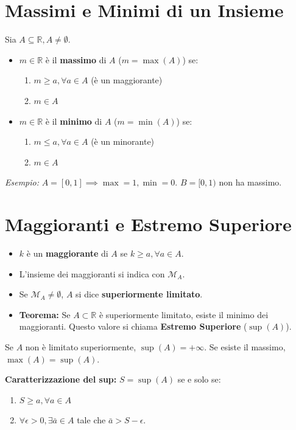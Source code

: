 \documentclass{article}
\begin{document}
\section*{Massimi e Minimi di un Insieme}
Sia $A \subseteq \mathbb{R}, A \neq \emptyset$.
\begin{itemize}
    \item $m \in \mathbb{R}$ è il \textbf{massimo} di $A$ ($m = \max(A)$) se:
    \begin{enumerate}
        \item $m \ge a, \forall a \in A$ (è un maggiorante)
        \item $m \in A$
    \end{enumerate}
    \item $m \in \mathbb{R}$ è il \textbf{minimo} di $A$ ($m = \min(A)$) se:
    \begin{enumerate}
        \item $m \le a, \forall a \in A$ (è un minorante)
        \item $m \in A$
    \end{enumerate}
\end{itemize}
\textit{Esempio:} $A=[0,1] \implies \max=1, \min=0$. $B=[0,1)$ non ha massimo.

\section*{Maggioranti e Estremo Superiore}
\begin{itemize}
    \item $k$ è un \textbf{maggiorante} di $A$ se $k \ge a, \forall a \in A$.
    \item L'insieme dei maggioranti si indica con $\mathcal{M}_A$.
    \item Se $\mathcal{M}_A \neq \emptyset$, $A$ si dice \textbf{superiormente limitato}.
    \item \textbf{Teorema:} Se $A \subset \mathbb{R}$ è superiormente limitato, esiste il minimo dei maggioranti. Questo valore si chiama \textbf{Estremo Superiore} ($\sup(A)$).
\end{itemize}
Se $A$ non è limitato superiormente, $\sup(A) = +\infty$.
Se esiste il massimo, $\max(A) = \sup(A)$.

\textbf{Caratterizzazione del sup:}
$S = \sup(A)$ se e solo se:
\begin{enumerate}
    \item $S \ge a, \forall a \in A$
    \item $\forall \epsilon > 0, \exists \bar{a} \in A$ tale che $\bar{a} > S - \epsilon$.
\end{enumerate}
\end{document}
